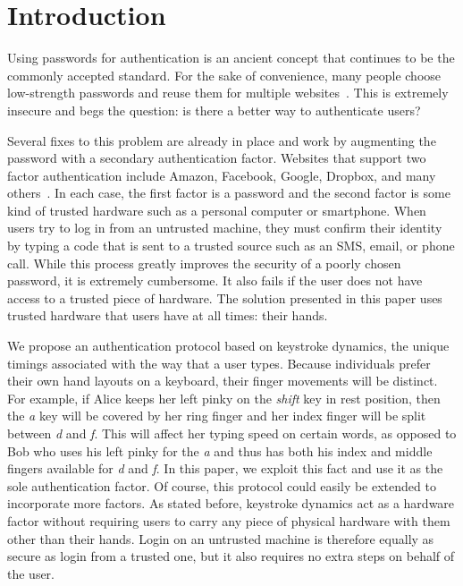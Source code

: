 \documentclass[11pt]{article}
\begin{document}
\section{Introduction}
Using passwords for authentication is an ancient concept that continues to be the commonly accepted standard. For the sake of convenience, many people choose low-strength passwords and reuse them for multiple websites~\cite{Florencio:2007:LSW:1242572.1242661}. This is extremely insecure and begs the question: is there a better way to authenticate users?

Several fixes to this problem are already in place and work by augmenting the password with a secondary authentication factor. Websites that support two factor authentication include Amazon, Facebook, Google, Dropbox, and many others~\cite{2fac}. In each case, the first factor is a password and the second factor is some kind of trusted hardware such as a personal computer or smartphone. When users try to log in from an untrusted machine, they must confirm their identity by typing a code that is sent to a trusted source such as an SMS, email, or phone call. While this process greatly improves the security of a poorly chosen password, it is extremely cumbersome. It also fails if the user does not have access to a trusted piece of hardware. The solution presented in this paper uses trusted hardware that users have at all times: their hands.

We propose an authentication protocol based on keystroke dynamics, the unique timings associated with the way that a user types. Because individuals prefer their own hand layouts on a keyboard, their finger movements will be distinct. For example, if Alice keeps her left pinky on the \textit{shift} key in rest position, then the \textit{a} key will be covered by her ring finger and her index finger will be split between \textit{d} and \textit{f}.  This will affect her typing speed on certain words, as opposed to Bob who uses his left pinky for the \textit{a} and thus has both his index and middle fingers available for \textit{d} and \textit{f}. In this paper, we exploit this fact and use it as the sole authentication factor. Of course, this protocol could easily be extended to incorporate more factors. As stated before, keystroke dynamics act as a hardware factor without requiring users to carry any piece of physical hardware with them other than their hands. Login on an untrusted machine is therefore equally as secure as login from a trusted one, but it also requires no extra steps on behalf of the user.
\end{document}
